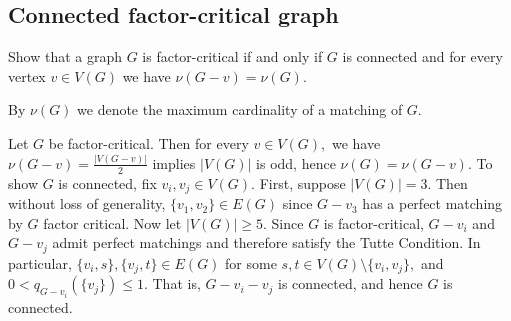 \documentclass{article}
\begin{document}
  \subsection{Connected factor-critical graph}
  \begin{centerframebox}
    Show that a graph $G$ is factor-critical if and only if $G$ is connected and
    for every vertex $v \in V(G)$ we have $\nu(G - v) = \nu(G)$.

    By $\nu(G)$ we denote the maximum cardinality of a matching of $G$.
  \end{centerframebox}

Let $G$ be factor-critical. Then for every $v\in V(G),$ we have $\nu(G-v)=\frac{|V(G-v)|}{2}$ implies $|V(G)|$ is odd, hence $\nu(G)=\nu(G-v).$ To show $G$ is connected, fix $v_i,v_j \in V(G).$ First, suppose $|V(G)|=3.$ Then without loss of generality, $\{v_1,v_2\}\in E(G)$ since $G-v_3$ has a perfect matching by $G$ factor critical. Now let $|V(G)|\geq 5.$ Since $G$ is factor-critical, $G-v_i$ and $G-v_j$ admit perfect matchings and therefore satisfy the Tutte Condition. In particular, $\{v_i,s\},\{v_j,t\}\in E(G)$ for some $s,t\in V(G)\setminus\{v_i,v_j\},$ and $0<q_{G-v_i}(\{v_j\})\leq 1.$ That is, $G-v_i-v_j$ is connected, and hence $G$ is connected.

\end{document}
